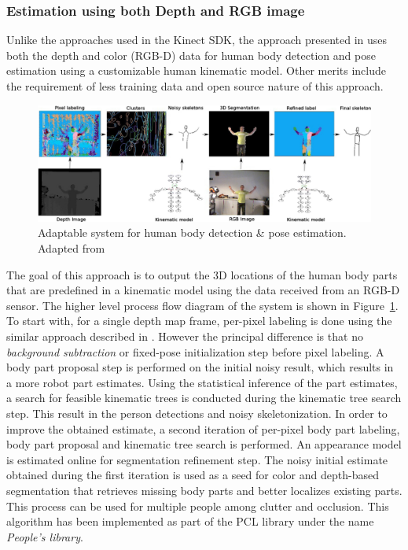 \subsubsection{Estimation using both Depth and RGB image}
Unlike the approaches used in the Kinect SDK, the approach presented in \cite{buys2014adaptable} uses both the depth and color (RGB-D) data for human body detection and pose estimation using a customizable human kinematic model. Other merits include the requirement of less training data and open source nature of this approach. 
\begin{figure}[H]
\centering
\includegraphics[width=\textwidth]{assets/adaptable_system_rgbd.png}
\caption[Adaptable system for human body detection and pose estimation]{Adaptable system for human body detection \& pose estimation. {Adapted from \cite{buys2014adaptable}}}
\label{fig:adaptable_rgbd}
\end{figure}
The goal of this approach is to output the 3D locations of the human body parts that are predefined in a kinematic model using the data received from an RGB-D sensor. The higher level process flow diagram of the system is shown in Figure~\ref{fig:adaptable_rgbd}. To start with, for a single depth map frame, per-pixel labeling is done using the similar approach described in \cite{shotton2013real}. However the principal difference is that no \emph{background subtraction} or fixed-pose initialization step before pixel labeling. A body part proposal step is performed on the initial noisy result, which results in a more robot part estimates. Using the statistical inference of the part estimates, a search for feasible kinematic trees is conducted during the kinematic tree search step. This result in the person detections and noisy skeletonization. In order to improve the obtained estimate, a second iteration of per-pixel body part labeling, body part proposal and kinematic tree search is performed. An appearance model is estimated online for segmentation refinement step. The noisy initial estimate obtained during the first iteration is used as a seed for color and depth-based segmentation that retrieves missing body parts and better localizes existing parts. This process can be used for multiple people among clutter and occlusion. This algorithm has been implemented as part of the PCL \cite{rusu20113d} library under the name \emph{People's library}.


